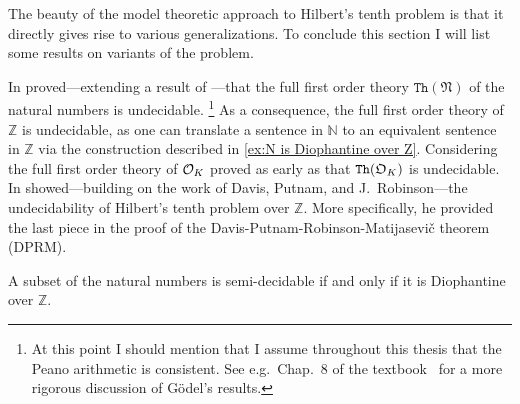 
The beauty of the model theoretic approach to Hilbert's tenth problem is that it
directly gives rise to various generalizations. To conclude this section I will
list some results on variants of the problem.

In \citeyear{Rosser1936} \textcite{Rosser1936} proved---extending a result of
\textcite{Goedel1931}---that the full first order theory
\(\mathtt{Th}(\mathfrak{N})\) of the natural numbers is undecidable.%
\footnote{At this point I should mention that I assume throughout this thesis
that the Peano arithmetic is consistent. See e.g.\ Chap.~8 of the
textbook~\cite{Cooper2004} for a more rigorous discussion of Gödel's results.}
As a consequence, the full first order theory of \(ℤ\) is undecidable, as one
can translate a sentence in \(ℕ\) to an equivalent sentence in \(ℤ\) via the
construction described in \cref{ex:N is Diophantine over Z}. Considering the
full first order theory of \(\mathcal{O}_{K}\) \textcite{Robinson1959} proved as early
as \citeyear{Robinson1959} that \(\mathtt{Th}(\mathfrak{O}_{K})\) is undecidable. In
\citeyear{Matijasevic1970} \textcite{Matijasevic1970} showed---building on the
work of Davis, Putnam, and J.~Robinson---the undecidability of Hilbert's tenth
problem over \(ℤ\). More specifically, he provided the last piece in the proof
of the Davis-Putnam-Robinson-Matijasevič theorem (\textsc{DPRM}).

\begin{thm}\label{thm:DPRM}
  A subset of the natural numbers is semi-decidable if and only if it is
  Diophantine over \(ℤ\).
\end{thm}


